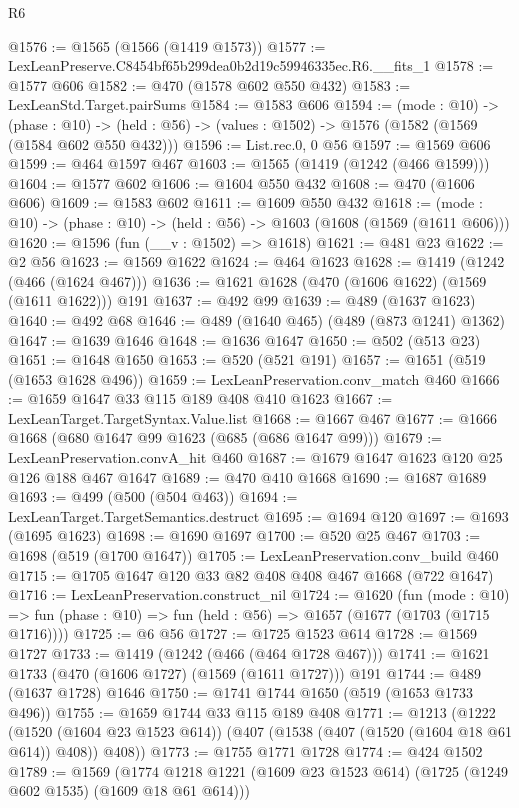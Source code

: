 \begin{lexlean}{R6}
\begin{coremodule}
@1576 := @1565 (@1566 (@1419 @1573))
@1577 := LexLeanPreserve.C8454bf65b299dea0b2d19c59946335ec.R6.__fits_1
@1578 := @1577 @606
@1582 := @470 (@1578 @602 @550 @432)
@1583 := LexLeanStd.Target.pairSums
@1584 := @1583 @606
@1594 := (mode : @10) ->
  (phase : @10) -> (held : @56) -> (values : @1502) -> @1576 (@1582 (@1569 (@1584 @602 @550 @432)))
@1596 := List.rec.{0, 0} @56
@1597 := @1569 @606
@1599 := @464 @1597 @467
@1603 := @1565 (@1419 (@1242 (@466 @1599)))
@1604 := @1577 @602
@1606 := @1604 @550 @432
@1608 := @470 (@1606 @606)
@1609 := @1583 @602
@1611 := @1609 @550 @432
@1618 := (mode : @10) -> (phase : @10) -> (held : @56) -> @1603 (@1608 (@1569 (@1611 @606)))
@1620 := @1596 (fun (__v : @1502) => @1618)
@1621 := @481 @23
@1622 := @2 @56
@1623 := @1569 @1622
@1624 := @464 @1623
@1628 := @1419 (@1242 (@466 (@1624 @467)))
@1636 := @1621 @1628 (@470 (@1606 @1622) (@1569 (@1611 @1622))) @191
@1637 := @492 @99
@1639 := @489 (@1637 @1623)
@1640 := @492 @68
@1646 := @489 (@1640 @465) (@489 (@873 @1241) @1362)
@1647 := @1639 @1646
@1648 := @1636 @1647
@1650 := @502 (@513 @23)
@1651 := @1648 @1650
@1653 := @520 (@521 @191)
@1657 := @1651 (@519 (@1653 @1628 @496))
@1659 := LexLeanPreservation.conv_match @460
@1666 := @1659 @1647 @33 @115 @189 @408 @410 @1623
@1667 := LexLeanTarget.TargetSyntax.Value.list
@1668 := @1667 @467
@1677 := @1666 @1668 (@680 @1647 @99 @1623 (@685 (@686 @1647 @99)))
@1679 := LexLeanPreservation.convA_hit @460
@1687 := @1679 @1647 @1623 @120 @25 @126 @188 @467 @1647
@1689 := @470 @410 @1668
@1690 := @1687 @1689
@1693 := @499 (@500 (@504 @463))
@1694 := LexLeanTarget.TargetSemantics.destruct
@1695 := @1694 @120
@1697 := @1693 (@1695 @1623)
@1698 := @1690 @1697
@1700 := @520 @25 @467
@1703 := @1698 (@519 (@1700 @1647))
@1705 := LexLeanPreservation.conv_build @460
@1715 := @1705 @1647 @120 @33 @82 @408 @408 @467 @1668 (@722 @1647)
@1716 := LexLeanPreservation.construct_nil
@1724 := @1620
    (fun (mode : @10) =>
    fun (phase : @10) => fun (held : @56) => @1657 (@1677 (@1703 (@1715 @1716))))
@1725 := @6 @56
@1727 := @1725 @1523 @614
@1728 := @1569 @1727
@1733 := @1419 (@1242 (@466 (@464 @1728 @467)))
@1741 := @1621 @1733 (@470 (@1606 @1727) (@1569 (@1611 @1727))) @191
@1744 := @489 (@1637 @1728) @1646
@1750 := @1741 @1744 @1650 (@519 (@1653 @1733 @496))
@1755 := @1659 @1744 @33 @115 @189 @408
@1771 := @1213
    (@1222
      (@1520 (@1604 @23 @1523 @614))
      (@407 (@1538 (@407 (@1520 (@1604 @18 @61 @614)) @408)) @408))
@1773 := @1755 @1771 @1728
@1774 := @424 @1502
@1789 := @1569
    (@1774 @1218 @1221 (@1609 @23 @1523 @614) (@1725 (@1249 @602 @1535) (@1609 @18 @61 @614)))

\end{coremodule}
\end{lexlean}
